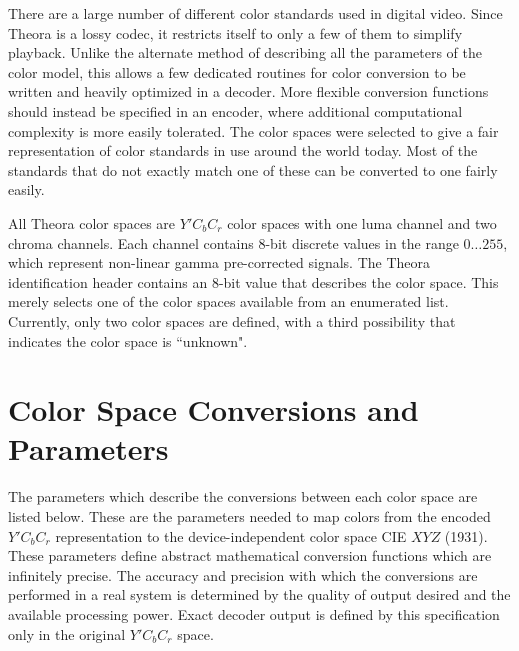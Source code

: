 \documentclass[9pt,letterpaper]{book}
\numberwithin{equation}{chapter}
\numberwithin{figure}{chapter}
\numberwithin{table}{chapter}
\begin{document}
There are a large number of different color standards used in digital video.
Since Theora is a lossy codec, it restricts itself to only a few of them to
 simplify playback.
Unlike the alternate method of describing all the parameters of the color
 model, this allows a few dedicated routines for color conversion to be written
 and heavily optimized in a decoder.
More flexible conversion functions should instead be specified in an encoder,
 where additional computational complexity is more easily tolerated.
The color spaces were selected to give a fair representation of color standards
 in use around the world today.
Most of the standards that do not exactly match one of these can be converted
 to one fairly easily.

All Theora color spaces are $Y'C_bC_r$ color spaces with one luma channel and
 two chroma channels.
Each channel contains 8-bit discrete values in the range $0\ldots255$, which
 represent non-linear gamma pre-corrected signals.
The Theora identification header contains an 8-bit value that describes the
 color space.
This merely selects one of the color spaces available from an enumerated list.
Currently, only two color spaces are defined, with a third possibility that
 indicates the color space is ``unknown".

\section{Color Space Conversions and Parameters}
\label{sec:color-xforms}

The parameters which describe the conversions between each color space are
 listed below.
These are the parameters needed to map colors from the encoded $Y'C_bC_r$
 representation to the device-independent color space CIE $XYZ$ (1931).
These parameters define abstract mathematical conversion functions which are
 infinitely precise.
The accuracy and precision with which the conversions are performed in a real
 system is determined by the quality of output desired and the available
 processing power.
Exact decoder output is defined by this specification only in the original
 $Y'C_bC_r$ space.
\end{document}
